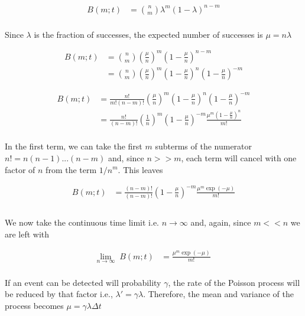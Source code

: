 \documentclass{ucetd}
\begin{document}
\begin{align*}
B(m;t) &= {n\choose m}\lambda^{m}(1-\lambda)^{n-m}\\
\end{align*}

Since $\lambda$ is the fraction of successes, the expected number of successes is $\mu = n\lambda$

\begin{align*}
B(m;t) &=  {n\choose m}\left(\frac{\mu}{n}\right)^{m}\left(1-\frac{\mu}{n}\right)^{n-m}\\
&= {n\choose m}\left(\frac{\mu}{n}\right)^{m}\left(1-\frac{\mu}{n}\right)^{n}\left(1-\frac{\mu}{n}\right)^{-m}
\end{align*}

\begin{align*}
B(m;t) &= \frac{n!}{m!(n-m)!}\left(\frac{\mu}{n}\right)^{m}\left(1-\frac{\mu}{n}\right)^{n}\left(1-\frac{\mu}{n}\right)^{-m}\\
&= \frac{n!}{(n-m)!}\left(\frac{1}{n}\right)^{m}\left(1-\frac{\mu}{n}\right)^{-m}\frac{\mu^{m}\left(1-\frac{\mu}{n}\right)^{n}}{m!}\\
\end{align*}

In the first term, we can take the first $m$ subterms of the numerator $n! = n(n-1)...(n-m)$ and, since $n>>m$, each term will cancel with one factor of $n$ from the term $1/n^{m}$. This leaves

\begin{align*}
B(m;t) &= \frac{(n-m)!}{(n-m)!}\left(1-\frac{\mu}{n}\right)^{-m}\frac{\mu^{m}\exp(-\mu)}{m!}\\\\
\end{align*}

We now take the continuous time limit i.e. $n\rightarrow\infty$ and, again, since $m << n$ we are left with 

\begin{align*}
\underset{n\rightarrow\infty}{\mathrm{lim}} \;\; B(m;t) &= \frac{\mu^{m}\exp(-\mu)}{m!}\\
\end{align*}

If an event can be detected will probability $\gamma$, the rate of the Poisson process will be reduced by that factor i.e., $\lambda' = \gamma\lambda$. Therefore, the mean and variance of the process becomes $\mu = \gamma\lambda\Delta t$
\end{document}
